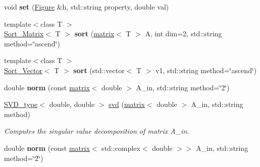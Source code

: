 \begin{DoxyCompactItemize}
\item 
\hypertarget{namespacekeycpp_afcd6ae07fc18f5374868fe314f00108c}{void {\bfseries set} (\hyperlink{classkeycpp_1_1_figure}{Figure} \&h, std\-::string property, double val)}\label{namespacekeycpp_afcd6ae07fc18f5374868fe314f00108c}

\item 
\hypertarget{namespacekeycpp_a6862448bf6e09309e60a6ba7aa0caf9a}{{\footnotesize template$<$class T $>$ }\\\hyperlink{structkeycpp_1_1_sort___matrix}{Sort\-\_\-\-Matrix}$<$ T $>$ {\bfseries sort} (\hyperlink{classkeycpp_1_1matrix}{matrix}$<$ T $>$ A, int dim=2, std\-::string method=\char`\"{}ascend\char`\"{})}\label{namespacekeycpp_a6862448bf6e09309e60a6ba7aa0caf9a}

\item 
\hypertarget{namespacekeycpp_a1be4e97b99a996a01f428fd8ba048fb0}{{\footnotesize template$<$class T $>$ }\\\hyperlink{structkeycpp_1_1_sort___vector}{Sort\-\_\-\-Vector}$<$ T $>$ {\bfseries sort} (std\-::vector$<$ T $>$ v1, std\-::string method=\char`\"{}ascend\char`\"{})}\label{namespacekeycpp_a1be4e97b99a996a01f428fd8ba048fb0}

\item 
\hypertarget{namespacekeycpp_a7e5236252f6a33f3523fb805a2d1727c}{double {\bfseries norm} (const \hyperlink{classkeycpp_1_1matrix}{matrix}$<$ double $>$ A\-\_\-in, std\-::string method=\char`\"{}2\char`\"{})}\label{namespacekeycpp_a7e5236252f6a33f3523fb805a2d1727c}

\item 
\hypertarget{namespacekeycpp_a4b80bd145aab03a9e79a42d32ca573bd}{\hyperlink{structkeycpp_1_1_s_v_d__type}{S\-V\-D\-\_\-type}$<$ double, double $>$ \hyperlink{namespacekeycpp_a4b80bd145aab03a9e79a42d32ca573bd}{svd} (\hyperlink{classkeycpp_1_1matrix}{matrix}$<$ double $>$ A\-\_\-in, std\-::string method)}\label{namespacekeycpp_a4b80bd145aab03a9e79a42d32ca573bd}

\begin{DoxyCompactList}\small\item\em Computes the singular value decomposition of matrix A\-\_\-in. \end{DoxyCompactList}\item 
\hypertarget{namespacekeycpp_a867ba604b4e72e41b123f890dd66d854}{double {\bfseries norm} (const \hyperlink{classkeycpp_1_1matrix}{matrix}$<$ std\-::complex$<$ double $>$$>$ A\-\_\-in, std\-::string method=\char`\"{}2\char`\"{})}\label{namespacekeycpp_a867ba604b4e72e41b123f890dd66d854}


\end{DoxyCompactItemize}
